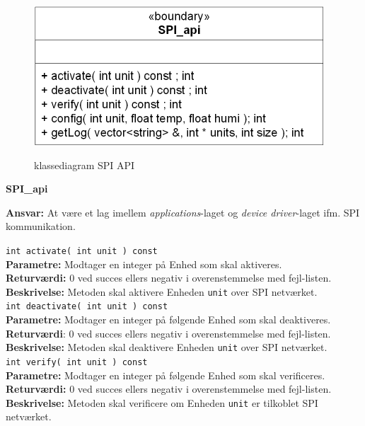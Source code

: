
\begin{figure}[htbp] \centering
{\includegraphics[scale=1.5]{filer/design/Klassediagrammer/SPI_API}}
\caption{klassediagram SPI API}
\label{fig:SPI API klassediagram}
\end{figure} 

{\centering
\textbf{SPI\_api}\par
}
\textbf{Ansvar:} At være et lag imellem \textit{applications}-laget og \textit{device driver}-laget ifm. SPI kommunikation. \

\verb+int activate( int unit ) const +\\
\textbf{Parametre:} Modtager en integer på Enhed som skal aktiveres. \\
\textbf{Returværdi:} 0 ved succes ellers negativ i overenstemmelse med fejl-listen. \\
\textbf{Beskrivelse:} Metoden skal aktivere Enheden \verb+unit+ over SPI netværket.\\

\verb+int deactivate( int unit ) const+ \\
\textbf{Parametre:}  Modtager en integer på følgende Enhed som skal deaktiveres.\\
\textbf{Returværdi}: 0 ved succes ellers negativ i overenstemmelse med fejl-listen. \\
\textbf{Beskrivelse:} Metoden skal deaktivere Enheden \verb+unit+ over SPI netværket.\\

\verb+int verify( int unit ) const+ \\
\textbf{Parametre:}  Modtager en integer på følgende Enhed som skal verificeres.\\
\textbf{Returværdi:} 0 ved succes ellers negativ i overenstemmelse med fejl-listen.   \\
\textbf{Beskrivelse:} Metoden skal verificere om Enheden \verb+unit+ er tilkoblet SPI netværket.\\

